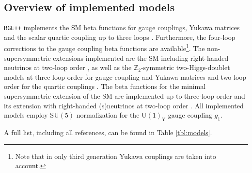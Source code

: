 \documentclass[11pt,a4paper]{article}
\begin{document}
\subsection{\label{sec::overview}Overview of implemented models}
\texttt{RGE++} implements the SM beta functions for gauge couplings, Yukawa matrices and the scalar quartic coupling up to three loops \cite{Machacek:1983tz,Machacek:1983fi,Machacek:1984zw,
                               Mihaila:2012fm,Mihaila:2012pz,Bednyakov:2012rb,Chetyrkin:2012rz,Bednyakov:2012en,Bednyakov:2014pia,Herren:2017uxn,Chetyrkin:2013wya,Bednyakov:2013eba,Bednyakov:2013cpa}.
Furthermore, the four-loop corrections to the gauge coupling beta functions \cite{Davies:2019onf} are available\footnote{Note that in \cite{Davies:2019onf} only third generation Yukawa couplings are taken into account.}.
The non-supersymmetric extensions implemented are the SM including right-handed neutrinos at two-loop order \cite{Machacek:1983tz,Machacek:1983fi,Machacek:1984zw, Antusch:2005gp, Grzadkowski:1987tf}, as well as
the $\mathbb{Z}_2$-symmetric two-Higgs-doublet models at three-loop order for gauge coupling and Yukawa matrices and two-loop order for the quartic couplings
\cite{Machacek:1983tz,Machacek:1983fi,Machacek:1984zw, Herren:2017uxn, Chowdhury:2015yja}.
The beta functions for the minimal supersymmetric extension of the SM are implemented up to three-loop order \cite{Martin:1993zk,Ferreira:1996ug} and its extension with right-handed (s)neutrinos at two-loop order
\cite{Martin:1993zk,Antusch:2005gp,Grzadkowski:1987wr}. All implemented models employ $\mathrm{SU}(5)$ normalization for the $\mathrm{U}(1)_\mathrm{Y}$ gauge coupling $g_1$.

A full list, including all references, can be found in Table \ref{tbl:models}.
\end{document}
